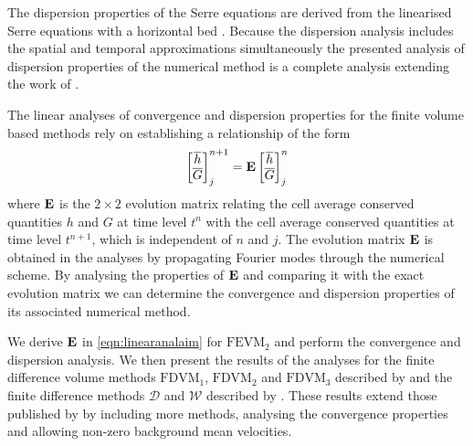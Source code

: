 The dispersion properties of the Serre equations are derived from the linearised Serre equations with a horizontal bed \cite{Zoppou-etal-2017}. Because the dispersion analysis includes the spatial and temporal approximations simultaneously the presented analysis of dispersion properties of the numerical method is a complete analysis extending the work of \citet{Filippini-etal-2016-381}.

The linear analyses of convergence and dispersion properties for the finite volume based methods rely on establishing a relationship of the form
\begin{equation}
\label{eqn:linearanalaim}
\begin{bmatrix}
\overline{h} \\\overline{G} 
\end{bmatrix}^{n+1}_j = \mathbf{E} \begin{bmatrix}
\overline{h} \\\overline{G}
\end{bmatrix}^{n}_j
\end{equation}
where $\mathbf{E}$ is the $2 \times 2$ evolution matrix relating the cell average conserved quantities $h$ and $G$ at time level $t^n$ with the cell average conserved quantities at time level $t^{n+1}$, which is independent of $n$ and $j$. The evolution matrix $\mathbf{E}$ is obtained in the analyses by propagating Fourier modes through the numerical scheme. By analysing the properties of $\mathbf{E}$ and comparing it with the exact evolution matrix we can determine the convergence and dispersion properties of its associated numerical method.
 
We derive $\mathbf{E}$ in \eqref{eqn:linearanalaim} for $\text{FEVM}_2$ and perform the convergence and dispersion analysis. We then present the results of the analyses for the finite difference volume methods $\text{FDVM}_1$, $\text{FDVM}_2$ and $\text{FDVM}_3$ described by \citet{Zoppou-etal-2017} and the finite difference methods $\mathcal{D}$ and $\mathcal{W}$ described by \citet{Pitt-2018-61}. These results extend those published by \citet{Zoppou-etal-2017} by including more methods, analysing the convergence properties and allowing non-zero background mean velocities.
 
